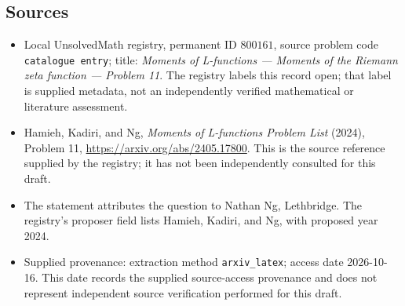 \documentclass[11pt]{article}
\begin{document}
\subsection{Sources}
\begin{itemize}
\item Local UnsolvedMath registry, permanent ID \(800161\), source problem code \texttt{catalogue entry}; title: \emph{Moments of L-functions --- Moments of the Riemann zeta function --- Problem 11}. The registry labels this record open; that label is supplied metadata, not an independently verified mathematical or literature assessment.
\item Hamieh, Kadiri, and Ng, \emph{Moments of L-functions Problem List} (2024), Problem 11, \url{https://arxiv.org/abs/2405.17800}. This is the source reference supplied by the registry; it has not been independently consulted for this draft.
\item The statement attributes the question to Nathan Ng, Lethbridge. The registry's proposer field lists Hamieh, Kadiri, and Ng, with proposed year 2024.
\item Supplied provenance: extraction method \texttt{arxiv\_latex}; access date 2026-10-16. This date records the supplied source-access provenance and does not represent independent source verification performed for this draft.
\end{itemize}
\end{document}
